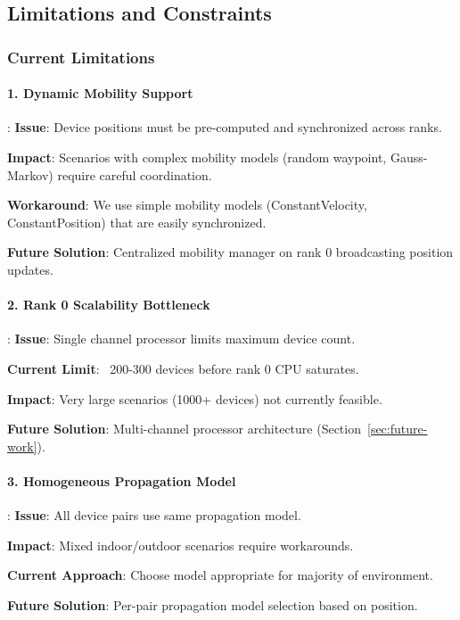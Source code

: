 \subsection{Limitations and Constraints}

\subsubsection{Current Limitations}

\paragraph{1. Dynamic Mobility Support}:
\textbf{Issue}: Device positions must be pre-computed and synchronized across ranks.

\textbf{Impact}: Scenarios with complex mobility models (random waypoint, Gauss-Markov) require careful coordination.

\textbf{Workaround}: We use simple mobility models (ConstantVelocity, ConstantPosition) that are easily synchronized.

\textbf{Future Solution}: Centralized mobility manager on rank 0 broadcasting position updates.

\paragraph{2. Rank 0 Scalability Bottleneck}:
\textbf{Issue}: Single channel processor limits maximum device count.

\textbf{Current Limit}: ~200-300 devices before rank 0 CPU saturates.

\textbf{Impact}: Very large scenarios (1000+ devices) not currently feasible.

\textbf{Future Solution}: Multi-channel processor architecture (Section~\ref{sec:future-work}).

\paragraph{3. Homogeneous Propagation Model}:
\textbf{Issue}: All device pairs use same propagation model.

\textbf{Impact}: Mixed indoor/outdoor scenarios require workarounds.

\textbf{Current Approach}: Choose model appropriate for majority of environment.

\textbf{Future Solution}: Per-pair propagation model selection based on position.

